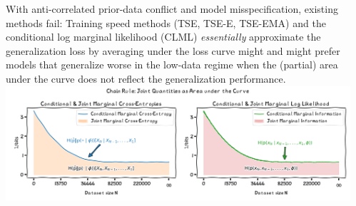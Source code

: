 \documentclass[25pt,a0paper,landscape]{tikzposter}
\begin{document}
\begin{columns}
{{        With anti-correlated prior-data conflict and model misspecification, existing methods fail:
        Training speed methods (TSE, TSE-E, TSE-EMA) \citep{lyle2020bayesian,ru2021speedy} and the conditional log marginal likelihood (CLML) \citep{fong2020marginal,lotfi2022bayesian} \emph{essentially} approximate the generalization loss by averaging under the loss curve might and might prefer models that generalize worse in the low-data regime when the (partial) area under the curve does not reflect the generalization performance.
        \includegraphics[width=\linewidth]{area_under_curve_1.00.png}
    }
  }
  \begin{subcolumns}
    {
    }
    {
}
\end{subcolumns}
\end{columns}
\end{document}

